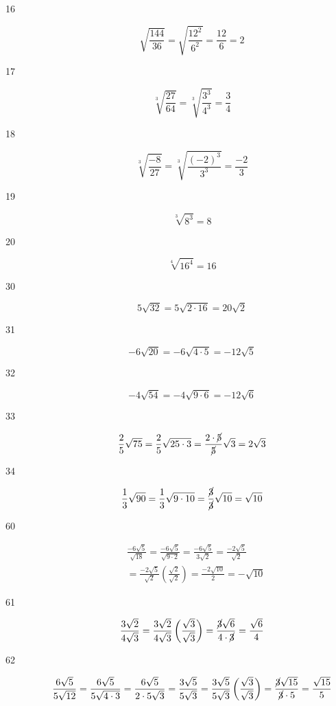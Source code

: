 \documentclass[fleqn,addpoints]{exam}
\begin{document}
\begin{description}
\item[16]
\[
  \sqrt{\frac{144}{36}} = \sqrt{\frac{12^2}{6^2}} = \frac{12}{6} = 2
\]

\item[17]
\[
  \sqrt[3]{\frac{27}{64}} = \sqrt[3]{\frac{3^3}{4^3}} = \frac{3}{4}
\]

\item[18]
\[
  \sqrt[3]{\frac{-8}{27}} = \sqrt[3]{\frac{(-2)^3}{3^3}} = \frac{-2}{3}
\]

\item[19]
\[
  \sqrt[3]{8^3} = 8
\]

\item[20]
\[
  \sqrt[4]{16^4} = 16
\]

\item[30]
\[
  5 \sqrt{32} = 5 \sqrt{2 \cdot 16} = 20 \sqrt{2}
\]

\item[31]
\[
  -6 \sqrt{20} = -6 \sqrt{4 \cdot 5} = -12 \sqrt{5}
\]

\item[32]
\[
  -4 \sqrt{54} = -4 \sqrt{9 \cdot 6} = -12 \sqrt{6}
\]

\item[33]
\[
  \frac{2}{5} \sqrt{75} = \frac{2}{5} \sqrt{25 \cdot 3} = \frac{2 \cdot \cancel{5}}{\cancel{5}} \sqrt{3} = 2 \sqrt{3}
\]

\item[34]
\[
  \frac{1}{3} \sqrt{90} = \frac{1}{3} \sqrt{9 \cdot 10} = \frac{\cancel{3}}{\cancel{3}} \sqrt{10} = \sqrt{10}
\]

\item[60]
\begin{align*}
  & \frac{-6 \sqrt{5}}{\sqrt{18}} 
    = \frac{-6 \sqrt{5}}{\sqrt{9 \cdot 2}} = \frac{-6 \sqrt{5}} {3 \sqrt{2}} 
    = \frac{-2 \sqrt{5}} {\sqrt{2}} \\
  &= \frac{-2 \sqrt{5}} {\sqrt{2}} \left( \frac{\sqrt{2}}{\sqrt{2}} \right)
    = \frac{-2 \sqrt{10}} {2} 
    = -\sqrt{10} 
\end{align*}

\item[61]
\[
  \frac{3 \sqrt{2} }{4 \sqrt{3} } = \frac{3 \sqrt{2} }{4 \sqrt{3} } \left( \frac{\sqrt{3}}{\sqrt{3}} \right)
  = \frac{\cancel{3} \sqrt{6}}{4 \cdot \cancel{3}} = \frac{\sqrt{6}}{4}
\]

\item[62]
\[
  \frac{6 \sqrt{5}}{5 \sqrt{12}} = \frac{6 \sqrt{5}}{5 \sqrt{4 \cdot 3}} = \frac{6 \sqrt{5}}{2 \cdot 5 \sqrt{3}} 
  = \frac{3 \sqrt{5}}{5 \sqrt{3}} = \frac{3 \sqrt{5}}{5 \sqrt{3}} \left( \frac{\sqrt{3}}{\sqrt{3}} \right)
  = \frac{\cancel{3} \sqrt{15}}{\cancel{3} \cdot 5} = \frac{\sqrt{15}}{5}
\]


\end{description}
\end{document}
